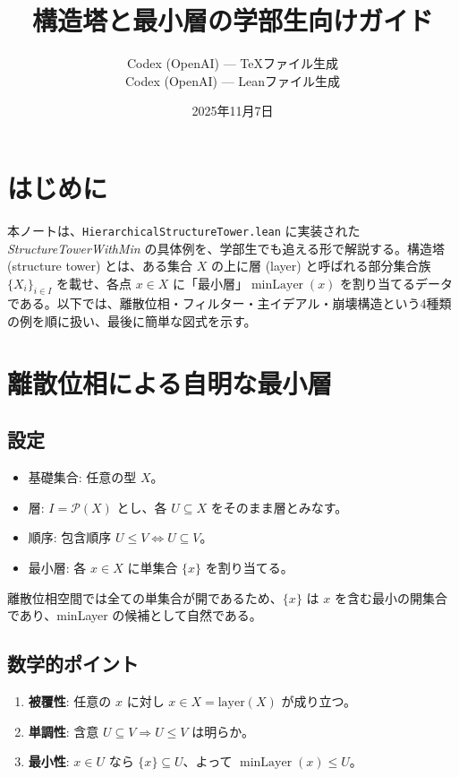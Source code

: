 \documentclass[11pt]{ltjsarticle}
\title{構造塔と最小層の学部生向けガイド}
\author{Codex (OpenAI) --- TeXファイル生成\\Codex (OpenAI) --- Leanファイル生成}
\date{2025年11月7日}
\begin{document}
\maketitle

\section*{はじめに}
本ノートは、\texttt{HierarchicalStructureTower.lean} に実装された \emph{StructureTowerWithMin} の具体例を、学部生でも追える形で解説する。構造塔 (structure tower) とは、ある集合 $X$ の上に層 (layer) と呼ばれる部分集合族 $\{X_i\}_{i\in I}$ を載せ、各点 $x\in X$ に「最小層」$\operatorname{minLayer}(x)$ を割り当てるデータである。以下では、離散位相・フィルター・主イデアル・崩壊構造という4種類の例を順に扱い、最後に簡単な図式を示す。

\section{離散位相による自明な最小層}
\subsection*{設定}
\begin{itemize}
  \item 基礎集合: 任意の型 $X$。
  \item 層: $I = \mathcal{P}(X)$ とし、各 $U \subseteq X$ をそのまま層とみなす。
  \item 順序: 包含順序 $U \le V \iff U \subseteq V$。
  \item 最小層: 各 $x \in X$ に単集合 $\{x\}$ を割り当てる。
\end{itemize}
離散位相空間では全ての単集合が開であるため、$\{x\}$ は $x$ を含む最小の開集合であり、minLayer の候補として自然である。

\subsection*{数学的ポイント}
\begin{enumerate}
  \item \textbf{被覆性}: 任意の $x$ に対し $x \in X = \text{layer}(X)$ が成り立つ。
  \item \textbf{単調性}: 含意 $U \subseteq V \Rightarrow U \le V$ は明らか。
  \item \textbf{最小性}: $x \in U$ なら $\{x\} \subseteq U$、よって $\operatorname{minLayer}(x) \le U$。
\end{enumerate}
\end{document}
